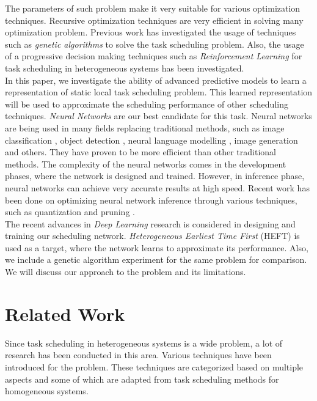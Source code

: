 \documentclass[twocolumn,11pt]{IEEEtran}
\begin{document}
The parameters of such problem make it very suitable for various optimization techniques. Recursive optimization techniques are very efficient in solving many optimization problem. Previous work has investigated the usage of techniques such as \emph{genetic algorithms} \cite{article2} to solve the task scheduling problem. Also, the usage of a progressive decision making techniques such as \emph{Reinforcement Learning} \cite{ORHEAN2018292} for task scheduling in heterogeneous systems has been investigated. \\

In this paper, we investigate the ability of advanced predictive models to learn a representation of static local task scheduling problem. This learned representation will be used to approximate the scheduling performance of other scheduling techniques. \emph{Neural Networks} are our best candidate for this task. Neural networks are being used in many fields replacing traditional methods, such as image classification \cite{10.1145/3065386}, object detection \cite{ren2015faster}, neural language modelling \cite{ren2015faster}, image generation \cite{karras2019analyzing} and others. They have proven to be more efficient than other traditional methods. The complexity of the neural networks comes in the development phases, where the network is designed and trained. However, in inference phase, neural networks can achieve very accurate results at high speed. Recent work has been done on optimizing neural network inference through various techniques, such as quantization \cite{choukroun2019lowbit} and pruning \cite{yeom2019pruning}. \\

The recent advances in \emph{Deep Learning} research is considered in designing and training our scheduling network. \emph{Heterogeneous Earliest Time First} (HEFT) \cite{993206} is used as a target, where the network learns to approximate its performance. Also, we include a genetic algorithm experiment for the same problem for comparison. We will discuss our approach to the problem and its limitations.

\section{Related Work}

Since task scheduling in heterogeneous systems is a wide problem, a lot of research has been conducted in this area. Various techniques have been introduced for the problem. These techniques are categorized based on multiple aspects \cite{inbook} and some of which are adapted from task scheduling methods for homogeneous systems.
\end{document}
